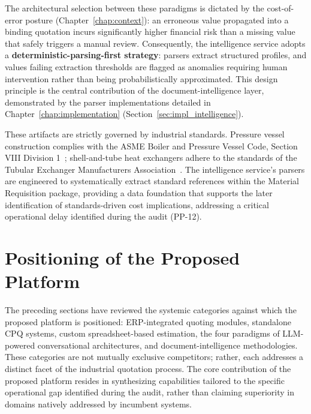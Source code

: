 The architectural selection between these paradigms is dictated by the cost-of-error posture (Chapter~\ref{chap:context}): an erroneous value propagated into a binding quotation incurs significantly higher financial risk than a missing value that safely triggers a manual review. Consequently, the intelligence service adopts a \textbf{deterministic-parsing-first strategy}: parsers extract structured profiles, and values failing extraction thresholds are flagged as anomalies requiring human intervention rather than being probabilistically approximated. This design principle is the central contribution of the document-intelligence layer, demonstrated by the parser implementations detailed in Chapter~\ref{chap:implementation} (Section~\ref{sec:impl_intelligence}).

These artifacts are strictly governed by industrial standards. Pressure vessel construction complies with the ASME Boiler and Pressure Vessel Code, Section VIII Division 1~\cite{asme_bpvc_viii_div1_2025}; shell-and-tube heat exchangers adhere to the standards of the Tubular Exchanger Manufacturers Association~\cite{tema_standards_11ed}. The intelligence service's parsers are engineered to systematically extract standard references within the Material Requisition package, providing a data foundation that supports the later identification of standards-driven cost implications, addressing a critical operational delay identified during the audit (PP-12).

\section{Positioning of the Proposed Platform}\label{sec:positioning}
The preceding sections have reviewed the systemic categories against which the proposed platform is positioned: ERP-integrated quoting modules, standalone CPQ systems, custom spreadsheet-based estimation, the four paradigms of LLM-powered conversational architectures, and document-intelligence methodologies. These categories are not mutually exclusive competitors; rather, each addresses a distinct facet of the industrial quotation process. The core contribution of the proposed platform resides in synthesizing capabilities tailored to the specific operational gap identified during the audit, rather than claiming superiority in domains natively addressed by incumbent systems.

